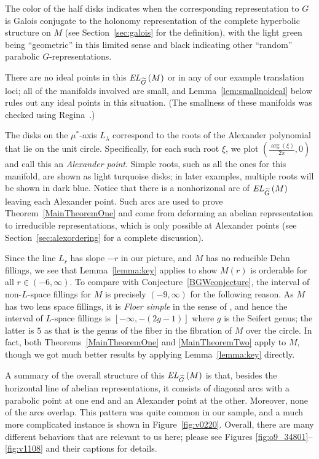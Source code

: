 \documentclass[tikz, sepfignums, defaultenums]{nmd/article}
\newcommand{\TEL}[1]{\mathit{EL}_\Gtil\left(#1\right)}
\begin{document}
The color of the half disks indicates when the corresponding
representation to $G$ is Galois conjugate to the holonomy
representation of the complete hyperbolic structure on $M$ (see
Section~\ref{sec:galois} for the definition), with the light green
being ``geometric'' in this limited sense and black indicating other
``random'' parabolic $G$-representations.

There are no ideal points in this $\TEL{M}$ or in any of our example
translation loci; all of the manifolds involved are small, and
Lemma~\ref{lem:smallnoideal} below rules out any ideal points in this
situation. (The smallness of these manifolds was checked using
Regina~\cite{Regina}.)

The disks on the $\mu^*$-axis $L_\lambda$ correspond to the roots of
the Alexander polynomial that lie on the unit circle.  Specifically,
for each such root $\xi$, we plot $\left(\frac{\arg(\xi)}{2\pi}, 0\right)$
and call this an \emph{Alexander point}.  Simple roots, such as all
the ones for this manifold, are shown as light turquoise disks; in
later examples, multiple roots will be shown in dark blue.  Notice
that there is a nonhorizonal arc of $\TEL{M}$ leaving each Alexander
point. Such arcs are used to prove Theorem~\ref{MainTheoremOne}
and come from deforming an abelian representation to irreducible
representations, which is only possible at Alexander points (see
Section~\ref{sec:alexordering} for a complete discussion).

Since the line $L_r$ has slope $-r$ in our picture, and $M$ has no
reducible Dehn fillings, we see that Lemma~\ref{lemma:key} applies to
show $M(r)$ is orderable for all $r \in (-6, \infty)$.  To compare
with Conjecture~\ref{BGWconjecture}, the interval of non-$L$-space
fillings for $M$ is precisely $(-9, \infty)$ for the following
reason. As $M$ has two lens space fillings, it is \emph{Floer simple}
in the sense of \cite{RasmussenRasmussen2015}, and hence the interval
of $L$-space fillings is $[-\infty, -(2g -1)]$ where $g$ is the
Seifert genus; the latter is $5$ as that is the genus of the fiber in
the fibration of $M$ over the circle.  In fact, both
Theorems~\ref{MainTheoremOne} and \ref{MainTheoremTwo} apply to $M$,
though we got much better results by applying Lemma~\ref{lemma:key}
directly.

A summary of the overall structure of this $\TEL{M}$ is that,
besides the horizontal line of abelian representations, it consists of
diagonal arcs with a parabolic point at one end and an Alexander point
at the other. Moreover, none of the arcs overlap.  This pattern was
quite common in our sample, and a much more complicated instance is
shown in Figure~\ref{fig:v0220}.  Overall, there are many different
behaviors that are relevant to us here; please see Figures
\ref{fig:o9_34801}--\ref{fig:v1108} and their captions for details. 
\end{document}
